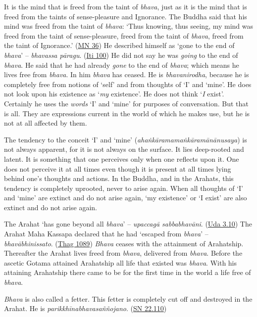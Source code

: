 It is the mind that is freed from the taint of \textit{bhava}, just as it is the mind that is freed from the taints of sense-pleasure and Ignorance. The Buddha said that his mind was freed from the taint of \textit{bhava}: `Thus knowing, thus seeing, my mind was freed from the taint of sense-pleasure, freed from the taint of \textit{bhava}, freed from the taint of Ignorance.' (\href{https://suttacentral.net/mn36/en/bodhi}{MN 36}) He described himself as `gone to the end of \textit{bhava}' -- \textit{bhavassa pāragu}. (\href{https://suttacentral.net/iti100/en/sujato}{Iti 100}) He did not say he was \emph{going} to the end of \textit{bhava}. He said that he had already \emph{gone} to the end of \textit{bhava}; which means he lives free from \textit{bhava}. In him \textit{bhava} has ceased. He is \textit{bhavanirodha}, because he is completely free from notions of `self' and from thoughts of `I' and `mine'. He does not look upon his existence as `\emph{my} existence'. He does not think `\emph{I} exist'. Certainly he uses the \emph{words} `I' and `mine' for purposes of conversation. But that is all. They are expressions current in the world of which he makes use, but he is not at all affected by them.

The tendency to the conceit `I' and `mine' (\textit{ahaṅkāramamaṅkāramānānusaya}) is not always apparent, for it is not always on the surface. It lies deep-rooted and latent. It is something that one perceives only when one reflects upon it. One does not perceive it at all times even though it is present at all times lying behind one's thoughts and actions. In the Buddha, and in the Arahats, this tendency is completely uprooted, never to arise again. When all thoughts of `I' and `mine' are extinct and do not arise again, `my existence' or `I exist' are also extinct and do not arise again.

The Arahat `has gone beyond all \textit{bhava}' -- \textit{upaccagā sabbabhavāni}. (\href{https://suttacentral.net/ud3.10/en/sujato}{Uda 3.10}) The Arahat Maha Kassapa declared that he had `escaped from \textit{bhava}' -- \textit{bhavābhinissato}. (\href{https://suttacentral.net/thag18.1/en/sujato}{Thag 1089}) \textit{Bhava} ceases with the attainment of Arahatship. Thereafter the Arahat lives freed from \textit{bhava}, delivered from \textit{bhava}. Before the ascetic Gotama attained Arahatship all life that existed was \textit{bhava}. With his attaining Arahatship there came to be for the first time in the world a life free of \textit{bhava}.

\textit{Bhava} is also called a fetter. This fetter is completely cut off and destroyed in the Arahat. He is \textit{parikkhīnabhavasaññojano}. (\href{https://suttacentral.net/sn22.110/en/sujato}{SN 22.110})

